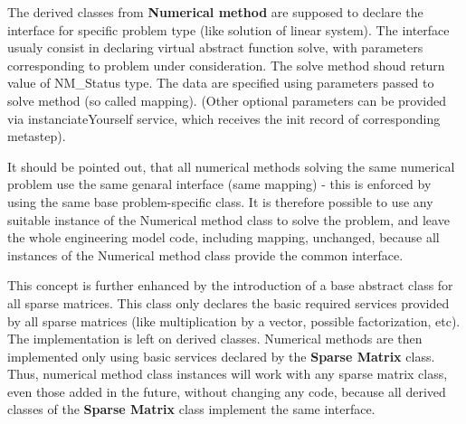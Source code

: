 \documentclass[a4paper]{article}
\newcommand{\class}[1]{{\bf #1}}
\begin{document}




The derived classes from \class{Numerical method} are supposed to
declare the interface for specific problem type
(like solution of linear system). The interface usualy consist in
declaring virtual abstract function solve, with parameters corresponding
to problem under consideration. The solve method shoud return
value of NM\_Status type. The data are specified using parameters passed to solve method (so called
mapping). (Other optional parameters can be provided via instanciateYourself
service, which receives the init record of corresponding metastep).

It should be pointed out, that all numerical methods solving the same
numerical problem use the same genaral interface (same mapping) - this is
enforced by using the same base problem-specific class. 
It is therefore possible to use any suitable
instance of the Numerical method class to solve the problem, and leave the  whole engineering model code,
including mapping, unchanged, because all instances of the Numerical
method class provide the common interface.

This concept is further enhanced by the introduction of a base abstract
class for all sparse matrices. This class only declares the basic
required services provided by all sparse matrices (like multiplication
by a vector, possible factorization, etc). The implementation is left on
derived classes.  Numerical methods are then implemented only
using basic services declared by the \class{Sparse Matrix} class. Thus, numerical
method class instances will work with any sparse matrix class, even
those added in the future, without changing any code, because all derived
classes of the \class{Sparse Matrix} class implement the same interface.
\end{document}
